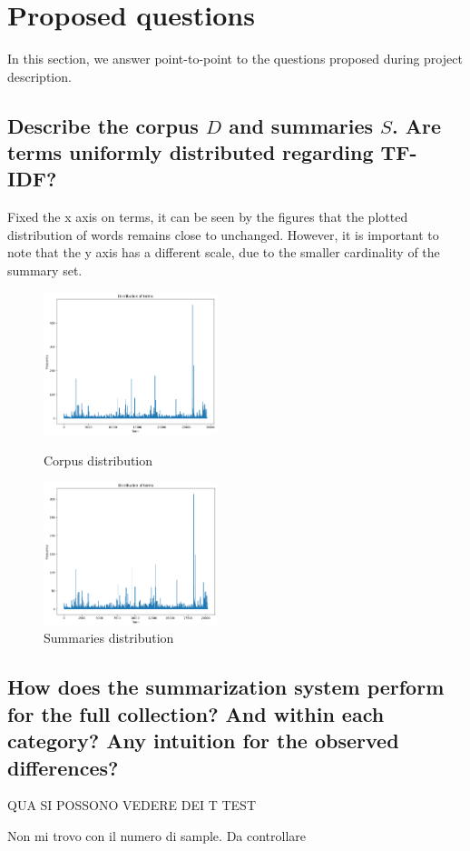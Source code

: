 \section{Proposed questions}
In this section, we answer point-to-point to the questions proposed during
project description.

\subsection{Describe the corpus $D$ and summaries $S$. Are terms uniformly distributed regarding TF-IDF?}
Fixed the x axis on terms, it can be seen by the figures that the plotted
distribution of words remains close to unchanged. However, it is important to
note that the y axis has a different scale, due to the smaller cardinality of
the summary set.
\begin{figure}[h]
    \centering
    \includegraphics[width=0.45\textwidth]{images/dist_D.png}
    \caption{Corpus distribution}
    \label{fig:Corpus}
    \includegraphics*[width=0.45\textwidth]{images/dist_S.png}
    \caption{Summaries distribution}
    \label{fig:Summaries}
\end{figure}
\subsection{How does the summarization system perform for the full collection? And within each category? Any intuition for the observed differences?}
QUA SI POSSONO VEDERE DEI T TEST

Non mi trovo con il numero di sample. Da controllare

